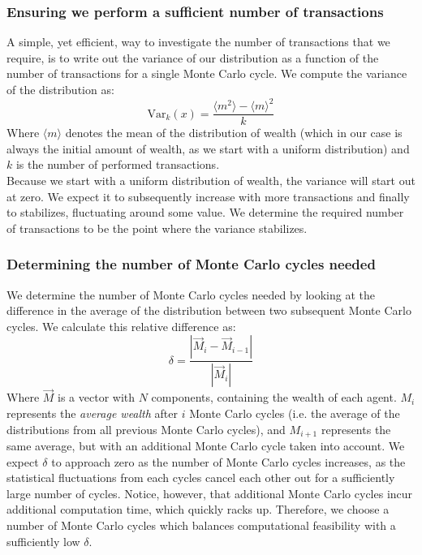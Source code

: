 \documentclass[a4paper, 10pt]{article}
\begin{document}
\subsubsection{Ensuring we perform a sufficient number of transactions}
A simple, yet efficient, way to investigate the number of transactions that we require, is to write out the variance of our distribution as a function of the number of transactions for a single Monte Carlo cycle. We compute the variance of the distribution as:
\begin{equation}
\mathrm{Var}_k(x)=\frac{\langle m^2 \rangle - \langle m \rangle^2 }{k}
\end{equation}
Where $\langle m \rangle$ denotes the mean of the distribution of wealth (which in our case is always the initial amount of wealth, as we start with a uniform distribution) and $k$ is the number of performed transactions.\\
\linebreak
Because we start with a uniform distribution of wealth, the variance will start out at zero. We expect it to subsequently increase with more transactions and finally to stabilizes, fluctuating around some value. We determine the required number of transactions to be the point where the variance stabilizes.
\subsubsection{Determining the number of Monte Carlo cycles needed}
We determine the number of Monte Carlo cycles needed by looking at the difference in the average of the distribution between two subsequent Monte Carlo cycles. We calculate this relative difference as:
\begin{equation}\label{eq:Relative_diff_MC_steps}
\delta = \frac{|\vec{M}_{i}-\vec{M}_{i-1}|}{|\vec{M}_i|}
\end{equation}
Where $\vec{M}$ is a vector with $N$ components, containing the wealth of each agent. $M_i$ represents the \textit{average wealth} after $i$ Monte Carlo cycles (i.e. the average of the distributions from all previous Monte Carlo cycles), and $M_{i+1}$ represents the same average, but with an additional Monte Carlo cycle taken into account. We expect $\delta$ to approach zero as the number of Monte Carlo cycles increases, as the statistical fluctuations from each cycles cancel each other out for a sufficiently large number of cycles. Notice, however, that additional Monte Carlo cycles incur additional computation time, which quickly racks up. Therefore, we choose a number of Monte Carlo cycles which balances computational feasibility with a sufficiently low $\delta$. 
\end{document}
